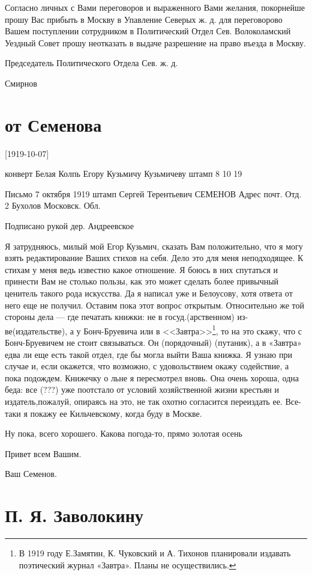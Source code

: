 \documentclass[]{memoir}
\begin{document}
Согласно личных с Вами переговоров и выраженного Вами желания, покорнейше прошу Вас прибыть в Москву в Упавление Северых ж. д. для переговорово Вашем поступлении сотрудником в Политический Отдел Сев.
Волоколамский Уездный Совет прошу неотказать в выдаче разрешение на право въезда в Москву.

Председатель Политического Отдела Сев. ж. д.

Смирнов


\section{от Семенова}

[1919-10-07]
        
конверт
Белая Колпь
Егору Кузьмичу Кузьмичеву
штамп 
8  10  19

Письмо
7 октября 1919
штамп
Сергей Терентьевич СЕМЕНОВ
Адрес почт. Отд. 2 Бухолов Московск. Обл.

 Подписано рукой дер. Андреевское

 Я затрудняюсь, милый мой Егор Кузьмич, сказать Вам положительно, что я могу взять редактирование Ваших стихов на себя. Дело это для меня неподходящее. К стихам у меня ведь известно какое отношение. Я боюсь в них спутаться и принести Вам не столько пользы, как это может сделать более привычный ценитель такого рода искусства. Да я написал уже и Белоусову, хотя ответа от него еще не получил.  Оставим пока этот вопрос открытым. Относительно же той стороны дела — где печатать книжки: не в госуд.(арственном) из-ве(издательстве), а у Бонч-Бруевича или в <<Завтра>>\footnote{В 1919 году Е.Замятин, К. Чуковский и А. Тихонов планировали издавать поэтический журнал «Завтра». Планы  не осуществились.}, то на это скажу, что с Бонч-Бруевичем не стоит связываться. Он (порядочный) (путаник), а в «Завтра» едва ли еще есть такой отдел, где бы могла выйти Ваша книжка. Я узнаю при случае и, если окажется, что возможно, с удовольствием окажу содействие, а пока подождем. Книжечку о льне я пересмотрел вновь. Она очень хороша, одна беда: все (???) уже поотстало от условий хозяйственной жизни крестьян и издатель,пожалуй, опираясь на это, не так охотно согласится переиздать ее. Все-таки я покажу ее Кильчевскому, когда буду в Москве.
 
Ну пока, всего хорошего. Какова погода-то, прямо золотая осень

Привет всем Вашим.

Ваш Семенов.

\section{П. Я. Заволокину}
\end{document}
